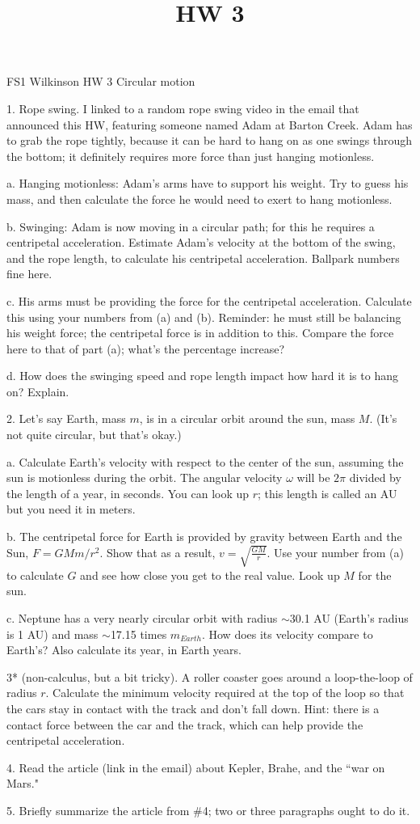 \documentclass[12pt]{article}
\title{HW 3}
\begin{document}
\setlength{\parindent}{0pt}
\setlength{\parskip}{3mm}

FS1 Wilkinson HW 3
Circular motion

1. Rope swing. I linked to a random rope swing video in the email that announced this HW, featuring someone named Adam at Barton Creek. Adam has to grab the rope tightly, because it can be hard to hang on as one swings through the bottom; it definitely requires more force than just hanging motionless.

a. Hanging motionless: Adam's arms have to support his weight. Try to guess his mass, and then calculate the force he would need to exert to hang motionless.

b. Swinging: Adam is now moving in a circular path; for this he requires a centripetal acceleration. Estimate Adam's velocity at the bottom of the swing, and the rope length, to calculate his centripetal acceleration. Ballpark numbers fine here.

c. His arms must be providing the force for the centripetal acceleration. Calculate this using your numbers from (a) and (b). Reminder: he must still be balancing his weight force; the centripetal force is in addition to this. Compare the force here to that of part (a); what's the percentage increase? 

d. How does the swinging speed and rope length impact how hard it is to hang on? Explain.


2. Let's say Earth, mass $m$, is in a circular orbit around the sun, mass $M$. (It's not quite circular, but that's okay.)

a. Calculate Earth's velocity with respect to the center of the sun, assuming the sun is motionless during the orbit. The angular velocity $\omega$ will be $2\pi$ divided by the length of a year, in seconds. You can look up $r$; this length is called an AU but you need it in meters.

b. The centripetal force for Earth is provided by gravity between Earth and the Sun, $F=GMm/r^2$. Show that as a result, $v=\sqrt{\frac{GM}{r}}$. Use your number from (a) to calculate $G$ and see how close you get to the real value. Look up $M$ for the sun.

c. Neptune has a very nearly circular orbit with radius $\sim$30.1 AU (Earth's radius is 1 AU) and mass $\sim$17.15 times $m_{Earth}$. How does its velocity compare to Earth's? Also calculate its year, in Earth years. 

3* (non-calculus, but a bit tricky). A roller coaster goes around a loop-the-loop of radius $r$. Calculate the minimum velocity required at the top of the loop so that the cars stay in contact with the track and don't fall down. Hint: there is a contact force between the car and the track, which can help provide the centripetal acceleration. 

4. Read  the article (link in the email) about Kepler, Brahe, and the ``war on Mars."

5. Briefly summarize the article from \#4; two or three paragraphs ought to do it.
\end{document}
